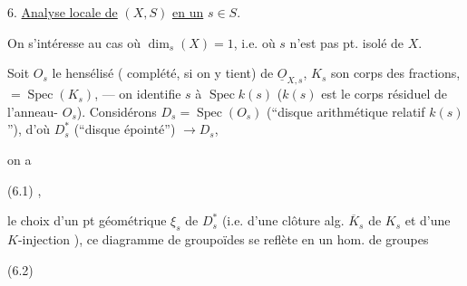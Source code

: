 6. \uline{Analyse locale de} $(X,S)$ \uline{en un} $s\in S$.

On s'intéresse au cas où $\dim_s(X)=1$, i.e. où $s$ n'est pas pt.
isolé de $X$.

Soit $O_s$ le hensélisé ( complété, si on y tient)
de $\underline{O}_{X,s}$, $K_s$ son corps des fractions,
$=\operatorname{Spec}(K_s)$, --- on identifie $s$ à
$\operatorname{Spec} k(s)$ ($k(s)$ est le corps résiduel de
l'anneau- $O_s$). Considérons
$D_s=\operatorname{Spec}(O_s)$ 
(``disque arithmétique relatif  $k(s)$''), d'où
$D_s^*$ 
(``disque épointé'') $\longrightarrow D_s$,



on a

(6.1)
,

 le choix d'un pt géométrique $\xi_s$ de $D_s^*$
 (i.e. d'une clôture alg.
$\overline K_s$ de $K_s$ et d'une $K$-injection
),
ce diagramme de groupoïdes se reflète en un hom. de groupes

(6.2)


